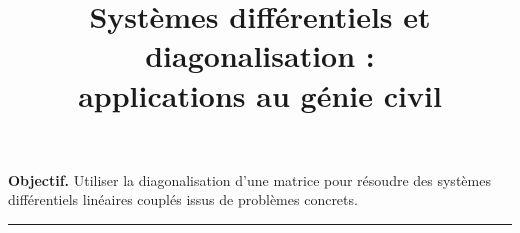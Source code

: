 

\usepackage{tikz, pgf}
\usetikzlibrary{arrows.meta,patterns,decorations.pathmorphing}
\newcommand{\R}{\mathbb{R}}
\newcommand{\dd}{\mathrm{d}}

\title{Systèmes différentiels et diagonalisation :\\
applications au génie civil}
\author{}
\date{}


\maketitle

\noindent\textbf{Objectif.}
Utiliser la diagonalisation d'une matrice pour résoudre des systèmes différentiels linéaires couplés issus de problèmes concrets.

\vspace{1.5em}
\hrule
\vspace{1em}


